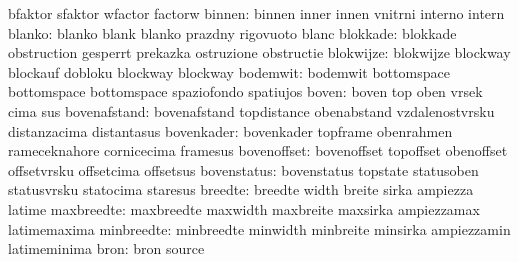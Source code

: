                            bfaktor                   sfaktor
                           wfactor                   factorw %
                   binnen: binnen                    inner
                           innen                     vnitrni
                           interno                   intern
                   blanko: blanko                    blank
                           blanko                    prazdny
                           rigovuoto                 blanc
                 blokkade: blokkade                  obstruction
                           gesperrt                  prekazka
                           ostruzione                obstructie
                blokwijze: blokwijze                 blockway
                           blockauf                  dobloku
                           blockway                  blockway %
                 bodemwit: bodemwit                  bottomspace
                           bottomspace               bottomspace
                           spaziofondo               spatiujos
                    boven: boven                     top
                           oben                      vrsek
                           cima                      sus
             bovenafstand: bovenafstand              topdistance
                           obenabstand               vzdalenostvrsku
                           distanzacima              distantasus
               bovenkader: bovenkader                topframe
                           obenrahmen                rameceknahore
                           cornicecima               framesus
              bovenoffset: bovenoffset               topoffset
                           obenoffset                offsetvrsku
                           offsetcima                offsetsus
              bovenstatus: bovenstatus               topstate
                           statusoben                statusvrsku
                           statocima                 staresus
                  breedte: breedte                   width
                           breite                    sirka
                           ampiezza                  latime
               maxbreedte: maxbreedte                maxwidth
                           maxbreite                 maxsirka
                           ampiezzamax               latimemaxima
               minbreedte: minbreedte                minwidth
                           minbreite                 minsirka
                           ampiezzamin               latimeminima %
                     bron: bron                      source
